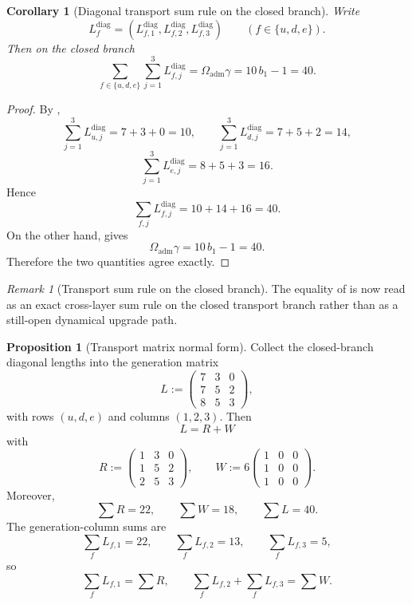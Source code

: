 \documentclass[11pt,a4paper]{article}
\newtheorem{corollary}[theorem]{Corollary}
\theoremstyle{definition}
\newtheorem{proposition}[theorem]{Proposition}
\theoremstyle{remark}
\newtheorem*{remark}{Remark}
\newcommand{\bone}{b_1}
\newcommand{\Oadm}{\Omega_{\mathrm{adm}}}
\begin{document}
\begin{corollary}[Diagonal transport sum rule on the closed branch]
\label{cor:transport-length-sum-rule}
Write
\[
L_f^{\mathrm{diag}}=(L_{f,1}^{\mathrm{diag}},L_{f,2}^{\mathrm{diag}},L_{f,3}^{\mathrm{diag}})
\qquad
(f\in\{u,d,e\}).
\]
Then on the closed branch
\[
\sum_{f\in\{u,d,e\}}\sum_{j=1}^{3}L_{f,j}^{\mathrm{diag}}
=
\Oadm\gamma
=
10\,\bone-1
=
40.
\]
\end{corollary}

\begin{proof}
By ,
\[
\sum_{j=1}^3L_{u,j}^{\mathrm{diag}}=7+3+0=10,
\qquad
\sum_{j=1}^3L_{d,j}^{\mathrm{diag}}=7+5+2=14,
\]
\[
\sum_{j=1}^3L_{e,j}^{\mathrm{diag}}=8+5+3=16.
\]
Hence
\[
\sum_{f,j}L_{f,j}^{\mathrm{diag}}=10+14+16=40.
\]
On the other hand,  gives
\[
\Oadm\gamma=10\,\bone-1=40.
\]
Therefore the two quantities agree exactly.
\end{proof}

\begin{remark}[Transport sum rule on the closed branch]
The equality of  is now read as an exact cross-layer sum
rule on the closed transport branch rather than as a still-open dynamical upgrade path.
\end{remark}

\begin{proposition}[Transport matrix normal form]
\label{prop:transport-matrix-normal-form}
Collect the closed-branch diagonal lengths into the generation matrix
\[
L:=
\begin{pmatrix}
7&3&0\\
7&5&2\\
8&5&3
\end{pmatrix},
\]
with rows $(u,d,e)$ and columns $(1,2,3)$. Then
\[
L=R+W
\]
with
\[
R:=
\begin{pmatrix}
1&3&0\\
1&5&2\\
2&5&3
\end{pmatrix},
\qquad
W:=
6\begin{pmatrix}
1&0&0\\
1&0&0\\
1&0&0
\end{pmatrix}.
\]
Moreover,
\[
\sum R=22,
\qquad
\sum W=18,
\qquad
\sum L=40.
\]
The generation-column sums are
\[
\sum_f L_{f,1}=22,
\qquad
\sum_f L_{f,2}=13,
\qquad
\sum_f L_{f,3}=5,
\]
so
\[
\sum_f L_{f,1}=\sum R,
\qquad
\sum_f L_{f,2}+\sum_f L_{f,3}=\sum W.
\]
\end{proposition}
\end{document}

